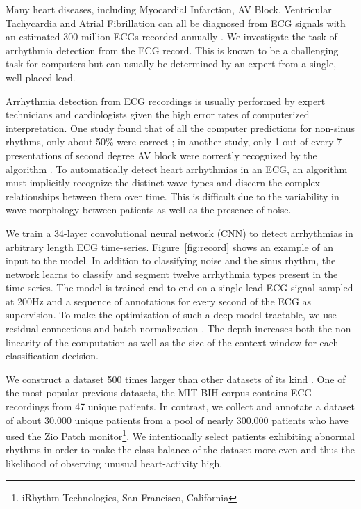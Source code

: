 \documentclass{article}
\begin{document}
Many heart diseases, including Myocardial Infarction, AV Block, Ventricular Tachycardia and Atrial Fibrillation can all be diagnosed from ECG signals with an estimated 300 million ECGs recorded annually \cite{heden1996detection}. We investigate the task of arrhythmia detection from the ECG record. This is known to be a challenging task for computers but can usually be determined by an expert from a single, well-placed lead.

Arrhythmia detection from ECG recordings is usually performed by expert technicians and cardiologists given the high error rates of computerized interpretation.  One study found that of all the computer predictions for non-sinus rhythms, only about 50\% were correct \cite{shah2007errors}; in another study, only 1 out of every 7 presentations of second degree AV block were correctly recognized by the algorithm \cite{guglin2006common}. To automatically detect heart arrhythmias in an ECG, an algorithm must implicitly recognize the distinct wave types and discern the complex relationships between them over time. This is difficult due to the variability in wave morphology between patients as well as the presence of noise.

We train a 34-layer convolutional neural network (CNN) to detect arrhythmias in arbitrary length ECG time-series. Figure~\ref{fig:record} shows an example of an input to the model. In addition to classifying noise and the sinus rhythm, the network learns to classify and segment twelve arrhythmia types present in the time-series. The model is trained end-to-end on a single-lead ECG signal sampled at 200Hz and a sequence of annotations for every second of the ECG as supervision. To make the optimization of such a deep model tractable, we use residual connections and batch-normalization \cite{he2016deep, ioffe2015batch}. The depth increases both the non-linearity of the computation as well as the size of the context window for each classification decision.

We construct a dataset 500 times larger than other datasets of its kind \cite{moody2001impact, goldberger2000physiobank}. One of the most popular previous datasets, the MIT-BIH corpus contains ECG recordings from 47 unique patients. In contrast, we collect and annotate a dataset of about 30,000 unique patients from a pool of nearly 300,000 patients who have used the Zio Patch monitor\footnote[1]{iRhythm Technologies, San Francisco, California}\cite{turakhia2013diagnostic}. We intentionally select patients exhibiting abnormal rhythms in order to make the class balance of the dataset more even and thus the likelihood of observing unusual heart-activity high.
\end{document}
